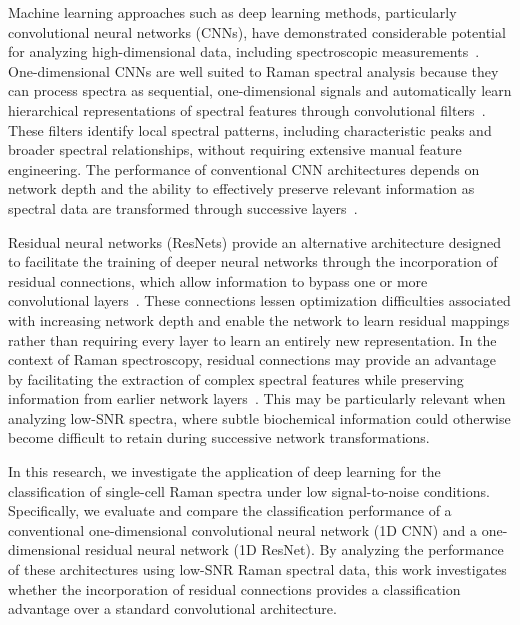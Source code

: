 \documentclass[journal,onecolumn]{IEEEtran}
\begin{document}
Machine learning approaches such as deep learning methods, particularly
convolutional neural networks (CNNs), have demonstrated considerable potential
for analyzing high-dimensional data, including spectroscopic
measurements~\cite{liu2017deep}. One-dimensional CNNs are well suited to Raman
spectral analysis because they can process spectra as sequential,
one-dimensional signals and automatically learn hierarchical representations of
spectral features through convolutional filters~\cite{kazemzadeh2022deep}.
These filters identify local spectral patterns, including characteristic
peaks and broader spectral relationships, without requiring extensive manual
feature engineering. The performance of conventional CNN architectures
depends on network depth and the ability to effectively preserve relevant
information as spectral data are transformed through successive
layers~\cite{zhang2024genotype}.

Residual neural networks (ResNets) provide an alternative architecture
designed to facilitate the training of deeper neural networks through the
incorporation of residual connections, which allow information to bypass one
or more convolutional layers~\cite{luo2022deep}. These connections lessen
optimization difficulties associated with increasing network depth and enable
the network to learn residual mappings rather than requiring every layer to
learn an entirely new representation. In the context of Raman spectroscopy,
residual connections may provide an advantage by facilitating the extraction
of complex spectral features while preserving information from earlier network
layers~\cite{luo2022deep}. This may be particularly relevant when analyzing
low-SNR spectra, where subtle biochemical information could otherwise become
difficult to retain during successive network transformations.

In this research, we investigate the application of deep learning for the
classification of single-cell Raman spectra under low signal-to-noise
conditions. Specifically, we evaluate and compare the classification
performance of a conventional one-dimensional convolutional neural network (1D
CNN) and a one-dimensional residual neural network (1D ResNet). By analyzing
the performance of these architectures using low-SNR Raman spectral data, this
work investigates whether the incorporation of residual connections provides a
classification advantage over a standard convolutional architecture.
\end{document}
